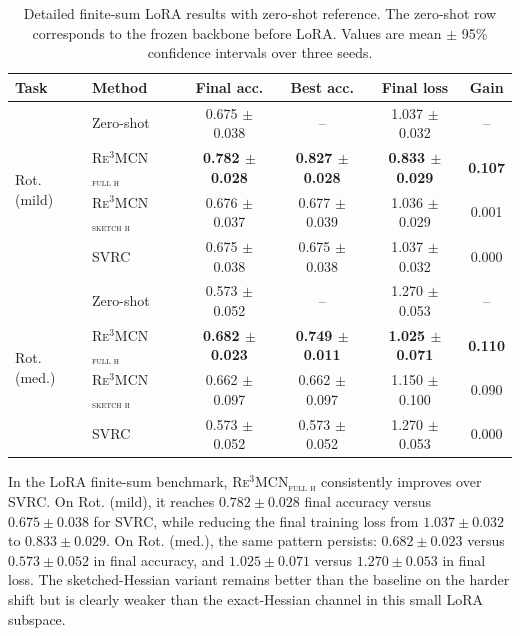 \documentclass{article}
\theoremstyle{plain}
\theoremstyle{definition}
\theoremstyle{remark}
\begin{document}
\begin{table}[ht!]
\centering
\small
\begin{tabular}{llcccc}
\toprule
Task & Method & Final acc. & Best acc. & Final loss & Gain \\
\midrule
\multirow{4}{*}{{Rot. (mild)}}
& Zero-shot & 0.675 $\pm$ 0.038 & -- & 1.037 $\pm$ 0.032 & -- \\
& \textsc{Re$^3$MCN$_{\text{full h}}$} & \textbf{0.782 $\pm$ 0.028} & \textbf{0.827 $\pm$ 0.028} & \textbf{0.833 $\pm$ 0.029} & \textbf{0.107} \\
& \textsc{Re$^3$MCN$_{\text{sketch h}}$} & 0.676 $\pm$ 0.037 & 0.677 $\pm$ 0.039 & 1.036 $\pm$ 0.029 & 0.001 \\
& \textsc{SVRC} & 0.675 $\pm$ 0.038 & 0.675 $\pm$ 0.038 & 1.037 $\pm$ 0.032 & 0.000 \\
\midrule
\multirow{4}{*}{{Rot. (med.)}}
& Zero-shot & 0.573 $\pm$ 0.052 & -- & 1.270 $\pm$ 0.053 & -- \\
& \textsc{Re$^3$MCN$_{\text{full h}}$} & \textbf{0.682 $\pm$ 0.023} & \textbf{0.749 $\pm$ 0.011} & \textbf{1.025 $\pm$ 0.071} & \textbf{0.110} \\
& \textsc{Re$^3$MCN$_{\text{sketch h}}$} & 0.662 $\pm$ 0.097 & 0.662 $\pm$ 0.097 & 1.150 $\pm$ 0.100 & 0.090 \\
& \textsc{SVRC} & 0.573 $\pm$ 0.052 & 0.573 $\pm$ 0.052 & 1.270 $\pm$ 0.053 & 0.000 \\
\bottomrule
\end{tabular}
\caption{Detailed finite-sum LoRA results with zero-shot reference. The zero-shot row corresponds to the frozen backbone before LoRA. Values are mean $\pm$ 95\% confidence intervals over three seeds.}
\label{tab:lora_finite_detailed}
\end{table}


In the LoRA finite-sum benchmark, \textsc{Re$^3$MCN$_{\text{full h}}$} consistently improves over \textsc{SVRC}. On {Rot. (mild)}, it reaches $0.782\pm0.028$ final accuracy versus $0.675\pm0.038$ for \textsc{SVRC}, while reducing the final training loss from $1.037\pm0.032$ to $0.833\pm0.029$. On {Rot. (med.)}, the same pattern persists: $0.682\pm0.023$ versus $0.573\pm0.052$ in final accuracy, and $1.025\pm0.071$ versus $1.270\pm0.053$ in final loss. The sketched-Hessian variant remains better than the baseline on the harder shift but is clearly weaker than the exact-Hessian channel in this small LoRA subspace.
\end{document}
